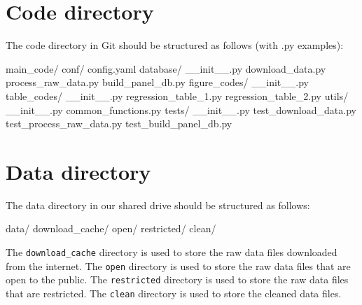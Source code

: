 \documentclass[
  letterpaper,
  DIV=11,
  numbers=noendperiod]{scrartcl}
\newenvironment{Shaded}{\begin{snugshade}}{\end{snugshade}}
\newcommand{\BuiltInTok}[1]{\textcolor[rgb]{0.00,0.23,0.31}{#1}}
\newcommand{\FunctionTok}[1]{\textcolor[rgb]{0.28,0.35,0.67}{#1}}
\newcommand{\NormalTok}[1]{\textcolor[rgb]{0.00,0.23,0.31}{#1}}
\newcommand{\OperatorTok}[1]{\textcolor[rgb]{0.37,0.37,0.37}{#1}}
\begin{document}
\hypertarget{code-directory}{%
\section{Code directory}\label{code-directory}}

The code directory in Git should be structured as follows (with .py
examples):

\begin{Shaded}
\begin{Highlighting}[]
\NormalTok{main\_code}\OperatorTok{/}
\NormalTok{    conf}\OperatorTok{/}
\NormalTok{        config.yaml}
\NormalTok{    database}\OperatorTok{/}
        \FunctionTok{\_\_init\_\_}\NormalTok{.py}
\NormalTok{        download\_data.py}
\NormalTok{        process\_raw\_data.py}
\NormalTok{        build\_panel\_db.py}
\NormalTok{    figure\_codes}\OperatorTok{/}
        \FunctionTok{\_\_init\_\_}\NormalTok{.py}
\NormalTok{    table\_codes}\OperatorTok{/}
        \FunctionTok{\_\_init\_\_}\NormalTok{.py}
\NormalTok{        regression\_table\_1.py}
\NormalTok{        regression\_table\_2.py}
\NormalTok{    utils}\OperatorTok{/}
        \FunctionTok{\_\_init\_\_}\NormalTok{.py}
\NormalTok{        common\_functions.py}
\NormalTok{    tests}\OperatorTok{/}
        \FunctionTok{\_\_init\_\_}\NormalTok{.py}
\NormalTok{        test\_download\_data.py}
\NormalTok{        test\_process\_raw\_data.py}
\NormalTok{        test\_build\_panel\_db.py}
\end{Highlighting}
\end{Shaded}

\hypertarget{data-directory}{%
\section{Data directory}\label{data-directory}}

The data directory in our shared drive should be structured as follows:

\begin{Shaded}
\begin{Highlighting}[]
\NormalTok{data}\OperatorTok{/}
\NormalTok{    download\_cache}\OperatorTok{/}
    \BuiltInTok{open}\OperatorTok{/}
\NormalTok{    restricted}\OperatorTok{/}
\NormalTok{    clean}\OperatorTok{/}
\end{Highlighting}
\end{Shaded}

The \texttt{download\_cache} directory is used to store the raw data
files downloaded from the internet. The \texttt{open} directory is used
to store the raw data files that are open to the public. The
\texttt{restricted} directory is used to store the raw data files that
are restricted. The \texttt{clean} directory is used to store the
cleaned data files.
\end{document}
